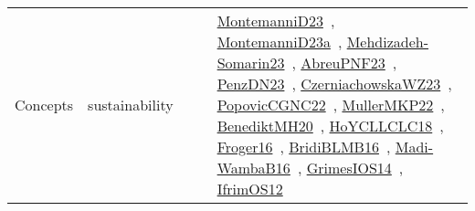 {\begin{longtable}{lp{3cm}>{\raggedright\arraybackslash}p{6cm}>{\raggedright\arraybackslash}p{6cm}>{\raggedright\arraybackslash}p{8cm}}
Concepts & sustainability &  &  & \href{../works/MontemanniD23.pdf}{MontemanniD23}~\cite{MontemanniD23}, \href{../works/MontemanniD23a.pdf}{MontemanniD23a}~\cite{MontemanniD23a}, \href{../works/Mehdizadeh-Somarin23.pdf}{Mehdizadeh-Somarin23}~\cite{Mehdizadeh-Somarin23}, \href{../works/AbreuPNF23.pdf}{AbreuPNF23}~\cite{AbreuPNF23}, \href{../works/PenzDN23.pdf}{PenzDN23}~\cite{PenzDN23}, \href{../works/CzerniachowskaWZ23.pdf}{CzerniachowskaWZ23}~\cite{CzerniachowskaWZ23}, \href{../works/PopovicCGNC22.pdf}{PopovicCGNC22}~\cite{PopovicCGNC22}, \href{../works/MullerMKP22.pdf}{MullerMKP22}~\cite{MullerMKP22}, \href{../works/BenediktMH20.pdf}{BenediktMH20}~\cite{BenediktMH20}, \href{../works/HoYCLLCLC18.pdf}{HoYCLLCLC18}~\cite{HoYCLLCLC18}, \href{../works/Froger16.pdf}{Froger16}~\cite{Froger16}, \href{../works/BridiBLMB16.pdf}{BridiBLMB16}~\cite{BridiBLMB16}, \href{../works/Madi-WambaB16.pdf}{Madi-WambaB16}~\cite{Madi-WambaB16}, \href{../works/GrimesIOS14.pdf}{GrimesIOS14}~\cite{GrimesIOS14}, \href{../works/IfrimOS12.pdf}{IfrimOS12}~\cite{IfrimOS12}\\

\end{longtable}}
